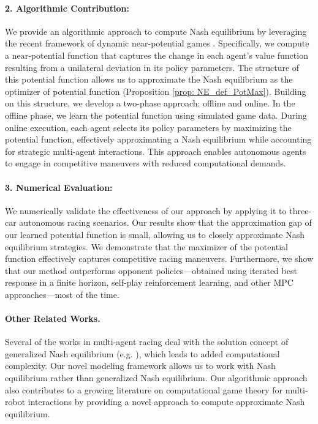 \paragraph{
2. Algorithmic Contribution:
} We provide an algorithmic approach to compute Nash equilibrium by leveraging the recent framework of dynamic near-potential games \citep{guo2023markov, maheshwari2024decentralized}. Specifically, we compute a near-potential function that captures the change in each agent's value function resulting from a unilateral deviation in its policy parameters. The structure of this potential function allows us to approximate the Nash equilibrium as the optimizer of potential function (Proposition \ref{prop: NE_def_PotMax}). Building on this structure, we develop a two-phase approach: offline and online. In the offline phase, we learn the potential function using simulated game data. During online execution, each agent selects its policy parameters by maximizing the potential function, effectively approximating a Nash equilibrium while accounting for strategic multi-agent interactions. This approach enables autonomous agents to engage in competitive maneuvers with reduced computational demands.

\paragraph{3. Numerical Evaluation:} We numerically validate the effectiveness of our approach by applying it to three-car autonomous racing scenarios. Our results show that the approximation gap of our learned potential function is small, allowing us to closely approximate Nash equilibrium strategies. We demonstrate that the maximizer of the potential function effectively captures competitive racing maneuvers. Furthermore, we show that our method outperforms opponent policies—obtained using iterated best response in a finite horizon, self-play reinforcement learning, and other MPC approaches—most of the time.

\paragraph{Other Related Works.} 
Several of the works in multi-agent racing deal with the solution concept of generalized Nash equilibrium (e.g. \citep{wang2019bgame, jia2023rapid}), which leads to added computational complexity. Our novel modeling framework allows us to work with Nash equilibrium rather than generalized Nash equilibrium.
Our algorithmic approach also contributes to a growing literature on computational game theory for multi-robot interactions \citep{laine2021multi, cleac2019algames, fridovich2020efficient, liu2023learning, peters2024contingency, kavuncu2021potential,sadigh2016planning,wang2020game}
by providing a novel approach to compute approximate Nash equilibrium. 


